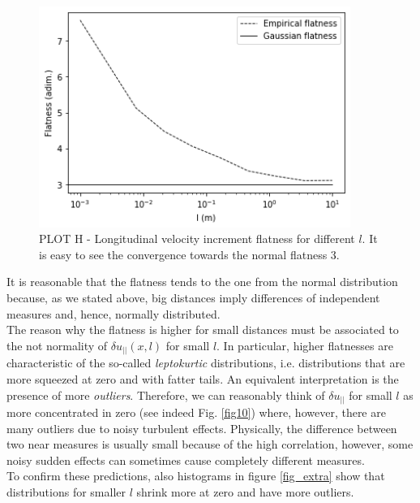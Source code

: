 \documentclass[11pt,titlepage]{article}
\begin{document}
\begin{center}
	\begin{figure} [h]
		\centering
		\includegraphics[width = 4in]{./figures/ex1_6_1.png}
		\caption{PLOT H - Longitudinal velocity increment flatness for different $l$. It is easy to see the convergence towards the normal flatness 3.}
		\label{fig11}
	\end{figure}
\end{center}
It is reasonable that the flatness tends to the one from the normal distribution because, as we stated above, big distances imply differences of independent measures and, hence, normally distributed. \\
The reason why the flatness is higher for small distances must be associated to the not normality of $\delta u_{||}(x,l)$ for small $l$. In particular, higher flatnesses are characteristic of the so-called \emph{leptokurtic} distributions, i.e. distributions that are more squeezed at zero and with fatter tails. An equivalent interpretation is the presence of more \emph{outliers}. Therefore, we can reasonably think of $\delta u_{||}$ for small $l$ as more concentrated in zero (see indeed Fig. \ref{fig10}) where, however, there are many outliers due to noisy turbulent effects. Physically, the difference between two near measures is usually small because of the high correlation, however, some noisy sudden effects can sometimes cause completely different measures.  \\
To confirm these predictions, also histograms in figure \ref{fig_extra} show that distributions for smaller $l$ shrink more at zero and have more outliers.
\end{document}
